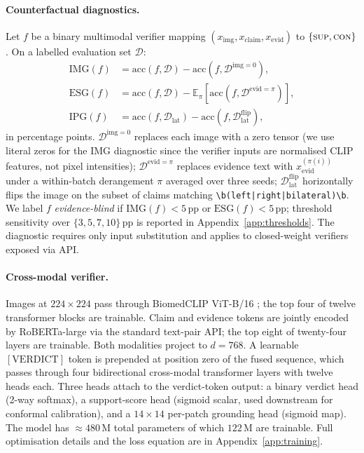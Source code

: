 \documentclass{article}
\begin{document}
\paragraph{Counterfactual diagnostics.} Let $f$ be a binary
multimodal verifier mapping
$(x_{\mathrm{img}}, x_{\mathrm{claim}}, x_{\mathrm{evid}})$ to
$\{\textsc{sup}, \textsc{con}\}$. On a labelled evaluation set
$\mathcal{D}$:
\begin{align}
\mathrm{IMG}(f) &= \mathrm{acc}(f, \mathcal{D}) -
                   \mathrm{acc}(f, \mathcal{D}^{\mathrm{img}=0}), \\
\mathrm{ESG}(f) &= \mathrm{acc}(f, \mathcal{D}) -
                   \mathbb{E}_{\pi}\!\left[\mathrm{acc}(f, \mathcal{D}^{\mathrm{evid}=\pi})\right], \\
\mathrm{IPG}(f) &= \mathrm{acc}(f, \mathcal{D}_{\mathrm{lat}}) -
                   \mathrm{acc}(f, \mathcal{D}_{\mathrm{lat}}^{\mathrm{flip}}),
\end{align}
in percentage points. $\mathcal{D}^{\mathrm{img}=0}$ replaces each
image with a zero tensor (we use literal zeros for the IMG diagnostic
since the verifier inputs are normalised CLIP features, not pixel
intensities); $\mathcal{D}^{\mathrm{evid}=\pi}$ replaces evidence
text with $x_{\mathrm{evid}}^{(\pi(i))}$ under a within-batch
derangement $\pi$ averaged over three seeds;
$\mathcal{D}_{\mathrm{lat}}^{\mathrm{flip}}$ horizontally flips the
image on the subset of claims matching
\texttt{\textbackslash b(left|right|bilateral)\textbackslash b}.
We label $f$ \emph{evidence-blind} if $\mathrm{IMG}(f) < 5$\,pp or
$\mathrm{ESG}(f) < 5$\,pp; threshold sensitivity over
$\{3, 5, 7, 10\}$\,pp is reported in Appendix~\ref{app:thresholds}.
The diagnostic requires only input substitution and applies to
closed-weight verifiers exposed via API.

\paragraph{Cross-modal verifier.} Images at $224 \times 224$ pass
through BiomedCLIP ViT-B/16 \citep{zhang2024biomedclip}; the top
four of twelve transformer blocks are trainable. Claim and evidence
tokens are jointly encoded by RoBERTa-large \citep{liu2019roberta}
via the standard text-pair API; the top eight of twenty-four layers
are trainable. Both modalities project to $d = 768$. A learnable
$[\mathrm{VERDICT}]$ token is prepended at position zero of the
fused sequence, which passes through four bidirectional cross-modal
transformer layers with twelve heads each. Three heads attach to
the verdict-token output: a binary verdict head (2-way softmax), a
support-score head (sigmoid scalar, used downstream for conformal
calibration), and a $14 \times 14$ per-patch grounding head (sigmoid
map). The model has $\approx 480$\,M total parameters of which
$122$\,M are trainable. Full optimisation details and the loss
equation are in Appendix~\ref{app:training}.
\end{document}
